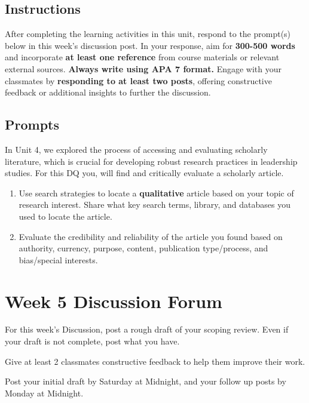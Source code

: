 \documentclass[
  letterpaper,
  DIV=11,
  numbers=noendperiod]{scrreprt}
\providecommand{\tightlist}{%
  \setlength{\itemsep}{0pt}\setlength{\parskip}{0pt}}\usepackage{longtable,booktabs,array}
\begin{document}
\section{Instructions}\label{instructions-3}

After completing the learning activities in this unit, respond to the
prompt(s) below in this week's discussion post. In your response, aim
for \textbf{300-500 words} and incorporate \textbf{at least one
reference} from course materials or relevant external sources.
\textbf{Always write using APA 7 format.} Engage with your classmates by
\textbf{responding to at least two posts}, offering constructive
feedback or additional insights to further the discussion.

\section{Prompts}\label{prompts-3}

In Unit 4, we explored the process of accessing and evaluating scholarly
literature, which is crucial for developing robust research practices in
leadership studies. For this DQ you, will find and critically evaluate a
scholarly article.

\begin{enumerate}
\def\labelenumi{\arabic{enumi}.}
\tightlist
\item
  Use search strategies to locate a \textbf{qualitative} article based
  on your topic of research interest. Share what key search terms,
  library, and databases you used to locate the article.
\item
  Evaluate the credibility and reliability of the article you found
  based on authority, currency, purpose, content, publication
  type/process, and bias/special interests.
\end{enumerate}


\chapter{Week 5 Discussion Forum}\label{week-5-discussion-forum}

For this week's Discussion, post a rough draft of your scoping review.
Even if your draft is not complete, post what you have.

Give at least 2 classmates constructive feedback to help them improve
their work.

Post your initial draft by Saturday at Midnight, and your follow up
posts by Monday at Midnight.
\end{document}
